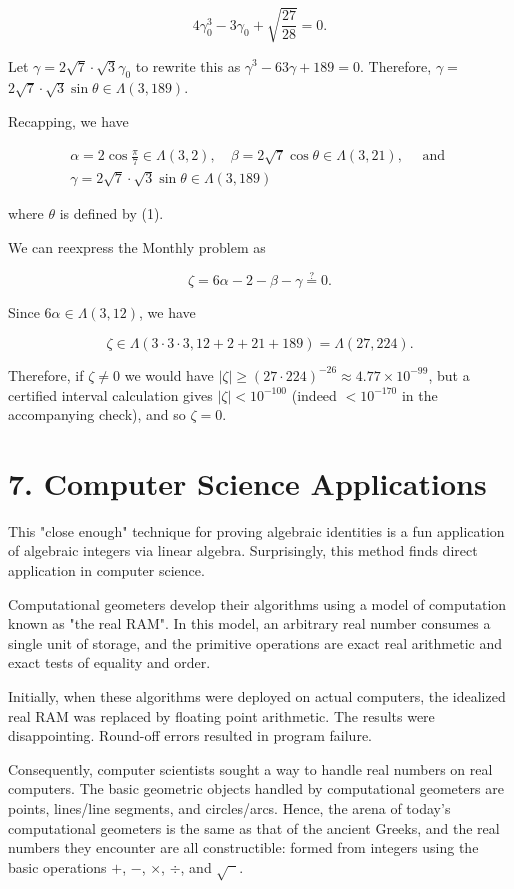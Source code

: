 \documentclass[11pt,letterpaper]{article}
\begin{document}
\[
4 \gamma_{0}^{3}-3 \gamma_{0}+\sqrt{\frac{27}{28}}=0 .
\]

Let $\gamma=2 \sqrt{7} \cdot \sqrt{3} \gamma_{0}$ to rewrite this as $\gamma^{3}-63 \gamma+189=0$. Therefore, $\gamma=$ $2 \sqrt{7} \cdot \sqrt{3} \sin \theta \in \Lambda(3,189)$.

Recapping, we have

\[
\begin{gathered}
\alpha=2 \cos \frac{\pi}{7} \in \Lambda(3,2), \quad \beta=2 \sqrt{7} \cos \theta \in \Lambda(3,21), \quad \text { and } \\
\gamma=2 \sqrt{7} \cdot \sqrt{3} \sin \theta \in \Lambda(3,189)
\end{gathered}
\]

where $\theta$ is defined by (1).

We can reexpress the Monthly problem as

\[
\zeta=6 \alpha-2-\beta-\gamma \stackrel{?}{=} 0 .
\]

Since $6 \alpha \in \Lambda(3,12)$, we have

\[
\zeta \in \Lambda(3 \cdot 3 \cdot 3,12+2+21+189)=\Lambda(27,224) .
\]

Therefore, if $\zeta \neq 0$ we would have $|\zeta| \geq(27 \cdot 224)^{-26} \approx 4.77 \times 10^{-99}$, but a certified interval calculation gives $|\zeta|<10^{-100}$ (indeed $<10^{-170}$ in the accompanying check), and so $\zeta=0$.

\section*{7. Computer Science Applications} This "close enough" technique for proving algebraic identities is a fun application of algebraic integers via linear algebra. Surprisingly, this method finds direct application in computer science.

Computational geometers develop their algorithms using a model of computation known as "the real RAM". In this model, an arbitrary real number consumes a single unit of storage, and the primitive operations are exact real arithmetic and exact tests of equality and order.

Initially, when these algorithms were deployed on actual computers, the idealized real RAM was replaced by floating point arithmetic. The results were disappointing. Round-off errors resulted in program failure.

Consequently, computer scientists sought a way to handle real numbers on real computers. The basic geometric objects handled by computational geometers are points, lines/line segments, and circles/arcs. Hence, the arena of today's computational geometers is the same as that of the ancient Greeks, and the real numbers they encounter are all constructible: formed from integers using the basic operations $+$, $-$, $\times$, $\div$, and $\sqrt{\phantom{x}}$.
\end{document}
